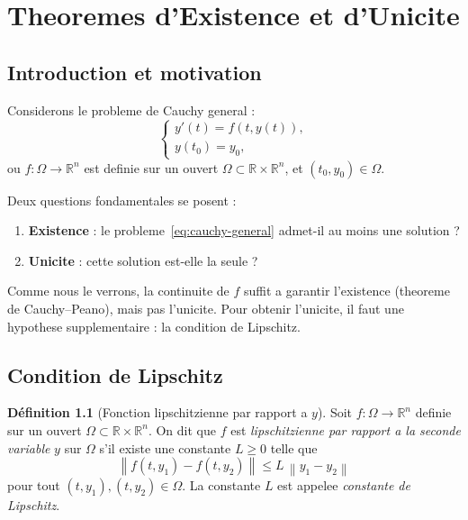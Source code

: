 \documentclass[12pt,a4paper,openany]{book}
\theoremstyle{definition}
\newtheorem{definition}{Définition}[chapter]
\theoremstyle{plain}
\theoremstyle{remark}
\newcommand{\R}{\mathbb{R}}
\newcommand{\norm}[1]{\left\|#1\right\|}
\begin{document}

\chapter{Theoremes d'Existence et d'Unicite}\label{ch:existence-unicite}

\section*{Introduction et motivation}

Considerons le probleme de Cauchy general :
\begin{equation}\label{eq:cauchy-general}
\begin{cases}
y'(t) = f(t, y(t)), \\
y(t_0) = y_0,
\end{cases}
\end{equation}
ou $f : \Omega \to \R^n$ est definie sur un ouvert $\Omega \subset \R \times \R^n$, et $(t_0, y_0) \in \Omega$.

Deux questions fondamentales se posent :
\begin{enumerate}[label=(\roman*)]
  \item \textbf{Existence} : le probleme~\eqref{eq:cauchy-general} admet-il au moins une solution ?
  \item \textbf{Unicite} : cette solution est-elle la seule ?
\end{enumerate}

Comme nous le verrons, la continuite de $f$ suffit a garantir l'existence (theoreme de Cauchy--Peano), mais pas l'unicite. Pour obtenir l'unicite, il faut une hypothese supplementaire : la condition de Lipschitz.

\section{Condition de Lipschitz}\label{sec:lipschitz}

\begin{definition}[Fonction lipschitzienne par rapport a $y$]\label{def:lipschitz}
Soit $f : \Omega \to \R^n$ definie sur un ouvert $\Omega \subset \R \times \R^n$. On dit que $f$ est \emph{lipschitzienne par rapport a la seconde variable} $y$ sur $\Omega$ s'il existe une constante $L \geq 0$ telle que
\[
  \norm{f(t, y_1) - f(t, y_2)} \leq L\, \norm{y_1 - y_2}
\]
pour tout $(t, y_1), (t, y_2) \in \Omega$. La constante $L$ est appelee \emph{constante de Lipschitz}.
\end{definition}
\end{document}
